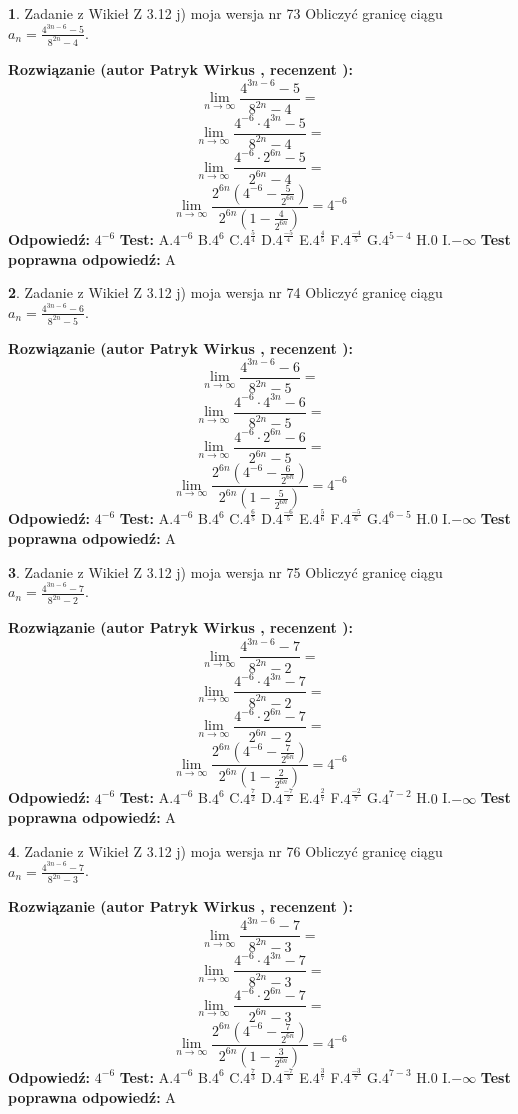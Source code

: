 \documentclass[12pt, a4paper]{article}
\theoremstyle{definition} %
\newtheorem{zad}{}
\newcommand{\zadStart}[1]{\begin{zad}#1\newline}
\newcommand{\zadStop}{\end{zad}}
\newcommand{\rozwStart}[2]{\noindent \textbf{Rozwiązanie (autor #1 , recenzent #2): }\newline}
\newcommand{\rozwStop}{\newline}
\newcommand{\odpStart}{\noindent \textbf{Odpowiedź:}\newline}
\newcommand{\odpStop}{\newline}
\newcommand{\testStart}{\noindent \textbf{Test:}\newline}
\newcommand{\testStop}{\newline}
\newcommand{\kluczStart}{\noindent \textbf{Test poprawna odpowiedź:}\newline}
\newcommand{\kluczStop}{\newline}
\begin{document}
\zadStart{Zadanie z Wikieł Z 3.12 j) moja wersja nr 73}
Obliczyć granicę ciągu $a_{n}=\frac{4^{3n-6}-5}{8^{2n}-4}$.
\zadStop
\rozwStart{Patryk Wirkus}{}
$$\lim\limits_{n\to\infty}\frac{4^{3n-6}-5}{8^{2n}-4}=$$
$$\lim\limits_{n\to\infty}\frac{4^{-6} \cdot 4^{3n}-5}{8^{2n}-4}=$$
$$\lim\limits_{n\to\infty}\frac{4^{-6} \cdot 2^{6n}-5}{2^{6n}-4}=$$
$$\lim\limits_{n\to\infty}\frac{2^{6n}(4^{-6} - \frac{5}{2^{6n}})}{2^{6n}(1-\frac{4}{2^{6n}})}= 4^{-6}$$
\rozwStop
\odpStart
$4^{-6}$
\odpStop
\testStart
A.$4^{-6}$
B.$4^{6}$
C.$4^{\frac{5}{4}}$
D.$4^{\frac{-5}{4}}$
E.$4^{\frac{4}{5}}$
F.$4^{\frac{-4}{5}}$
G.$4^{5-4}$
H.$0$
I.$-\infty$
\testStop
\kluczStart
A
\kluczStop



\zadStart{Zadanie z Wikieł Z 3.12 j) moja wersja nr 74}
Obliczyć granicę ciągu $a_{n}=\frac{4^{3n-6}-6}{8^{2n}-5}$.
\zadStop
\rozwStart{Patryk Wirkus}{}
$$\lim\limits_{n\to\infty}\frac{4^{3n-6}-6}{8^{2n}-5}=$$
$$\lim\limits_{n\to\infty}\frac{4^{-6} \cdot 4^{3n}-6}{8^{2n}-5}=$$
$$\lim\limits_{n\to\infty}\frac{4^{-6} \cdot 2^{6n}-6}{2^{6n}-5}=$$
$$\lim\limits_{n\to\infty}\frac{2^{6n}(4^{-6} - \frac{6}{2^{6n}})}{2^{6n}(1-\frac{5}{2^{6n}})}= 4^{-6}$$
\rozwStop
\odpStart
$4^{-6}$
\odpStop
\testStart
A.$4^{-6}$
B.$4^{6}$
C.$4^{\frac{6}{5}}$
D.$4^{\frac{-6}{5}}$
E.$4^{\frac{5}{6}}$
F.$4^{\frac{-5}{6}}$
G.$4^{6-5}$
H.$0$
I.$-\infty$
\testStop
\kluczStart
A
\kluczStop



\zadStart{Zadanie z Wikieł Z 3.12 j) moja wersja nr 75}
Obliczyć granicę ciągu $a_{n}=\frac{4^{3n-6}-7}{8^{2n}-2}$.
\zadStop
\rozwStart{Patryk Wirkus}{}
$$\lim\limits_{n\to\infty}\frac{4^{3n-6}-7}{8^{2n}-2}=$$
$$\lim\limits_{n\to\infty}\frac{4^{-6} \cdot 4^{3n}-7}{8^{2n}-2}=$$
$$\lim\limits_{n\to\infty}\frac{4^{-6} \cdot 2^{6n}-7}{2^{6n}-2}=$$
$$\lim\limits_{n\to\infty}\frac{2^{6n}(4^{-6} - \frac{7}{2^{6n}})}{2^{6n}(1-\frac{2}{2^{6n}})}= 4^{-6}$$
\rozwStop
\odpStart
$4^{-6}$
\odpStop
\testStart
A.$4^{-6}$
B.$4^{6}$
C.$4^{\frac{7}{2}}$
D.$4^{\frac{-7}{2}}$
E.$4^{\frac{2}{7}}$
F.$4^{\frac{-2}{7}}$
G.$4^{7-2}$
H.$0$
I.$-\infty$
\testStop
\kluczStart
A
\kluczStop



\zadStart{Zadanie z Wikieł Z 3.12 j) moja wersja nr 76}
Obliczyć granicę ciągu $a_{n}=\frac{4^{3n-6}-7}{8^{2n}-3}$.
\zadStop
\rozwStart{Patryk Wirkus}{}
$$\lim\limits_{n\to\infty}\frac{4^{3n-6}-7}{8^{2n}-3}=$$
$$\lim\limits_{n\to\infty}\frac{4^{-6} \cdot 4^{3n}-7}{8^{2n}-3}=$$
$$\lim\limits_{n\to\infty}\frac{4^{-6} \cdot 2^{6n}-7}{2^{6n}-3}=$$
$$\lim\limits_{n\to\infty}\frac{2^{6n}(4^{-6} - \frac{7}{2^{6n}})}{2^{6n}(1-\frac{3}{2^{6n}})}= 4^{-6}$$
\rozwStop
\odpStart
$4^{-6}$
\odpStop
\testStart
A.$4^{-6}$
B.$4^{6}$
C.$4^{\frac{7}{3}}$
D.$4^{\frac{-7}{3}}$
E.$4^{\frac{3}{7}}$
F.$4^{\frac{-3}{7}}$
G.$4^{7-3}$
H.$0$
I.$-\infty$
\testStop
\kluczStart
A
\kluczStop
\end{document}

